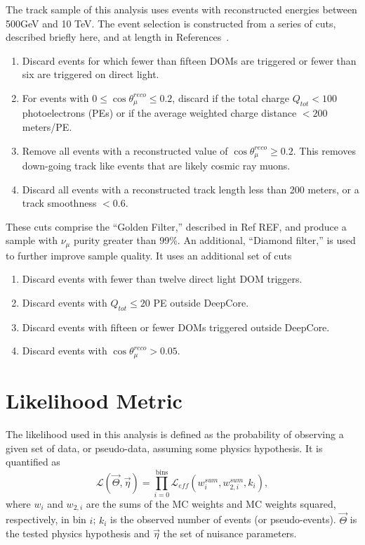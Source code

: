 \documentclass[main.tex]{subfiles}
\begin{document}
The track sample of this analysis uses events with reconstructed energies between 500GeV and 10 TeV. 
The event selection is constructed from a series of cuts, described briefly here, and at length in References~\cite{Aartsen_2020, Aartsen_2020_prd, axani2020sterile}. %

\begin{enumerate}
    \item Discard events for which fewer than fifteen DOMs are triggered or fewer than six are triggered on direct light.
    \item  For events with $0\leq\cos\theta_{\mu}^{reco}\leq 0.2$, discard if the total charge $Q_{tot}<100$ photoelectrons (PEs) or if the average weighted charge distance $<200$ meters/PE. 
    \item Remove all events with a reconstructed value of $\cos\theta_{\mu}^{reco}\geq 0.2$. This removes down-going track like events that are likely cosmic ray muons. 
    \item Discard all events with a reconstructed track length less than 200 meters, or a track smoothness $<0.6$.
\end{enumerate}

These cuts comprise the ``Golden Filter,'' described in Ref REF, and produce a sample with $\nu_{\mu}$ purity greater than 99\%. %
An additional, ``Diamond filter,'' is used to further improve sample quality. 
It uses an additional set of cuts
\begin{enumerate}
    \item Discard events with fewer than twelve direct light DOM triggers. 
    \item Discard events with $Q_{tot}\leq20$ PE outside DeepCore. 
    \item Discard events with fifteen or fewer DOMs triggered outside DeepCore. 
    \item Discard events with $\cos\theta_{\mu}^{reco}>0.05$.
\end{enumerate}

\section{Likelihood Metric}\label{sect:llh_metric}

The likelihood used in this analysis is defined as the probability of observing a given set of data, or pseudo-data, assuming some physics hypothesis.
It is quantified as 
\begin{equation}
    \mathcal{L}(\vec{\Theta}, \vec{\eta}) = \prod_{i=0}^{\text{bins}} \mathcal{L}_{eff}\left( w_{i}^{sum}, w_{2,i}^{sum}, k_{i} \right),
\end{equation}
where $w_{i}$ and $w_{2,i}$ are the sums of the MC weights and MC weights squared, respectively, in bin $i$; $k_{i}$ is the observed number of events (or pseudo-events). 
$\vec{\Theta}$ is the tested physics hypothesis and $\vec{\eta}$ the set of nuisance parameters. 
\end{document}
